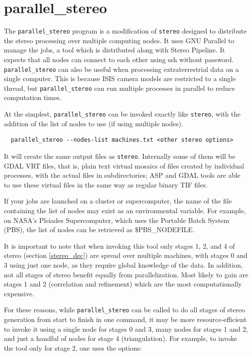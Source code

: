 \section{parallel\_stereo}
\label{parallel}

The \texttt{parallel\_stereo} program is a modification of
\texttt{stereo} designed to distribute the stereo processing over
multiple computing nodes. It uses GNU Parallel to manage the jobs, a tool which
is distributed along with Stereo Pipeline. It expects that all nodes
can connect to each other using ssh without password. \texttt{parallel\_stereo}
can also be useful when processing extraterrestrial data on a single computer.
This is because ISIS camera models are restricted to a single thread, but
\texttt{parallel\_stereo} can run multiple processes in parallel to reduce
computation times.

At the simplest, \texttt{parallel\_stereo} can be invoked exactly like \texttt{stereo},
with the addition of the list of nodes to use (if using multiple nodes).

\begin{verbatim}
  parallel_stereo --nodes-list machines.txt <other stereo options>
\end{verbatim}

It will create the same output files as \texttt{stereo}. Internally
some of them will be GDAL VRT files, that is, plain text virtual mosaics 
of files created by individual processes, with the actual files in subdirectories;
ASP and GDAL tools are able to use these
virtual files in the same way as regular binary TIF files.

If your jobs are launched on a cluster or supercomputer, the name of the
file containing the list of nodes may exist as an environmental
variable. For example, on NASA's Pleiades Supercomputer, which uses the
Portable Batch System (PBS), the list of nodes can be retrieved as
\$PBS\_NODEFILE.

It is important to note that when invoking this tool only stages 1, 2,
and 4 of stereo (section \ref{stereo_dec}) are spread over multiple
machines, with stages 0 and 3 using just one node, as they require
global knowledge of the data. In addition, not all stages of stereo
benefit equally from parallelization. Most likely to gain are stages 1
and 2 (correlation and refinement) which are the most computationally
expensive.

For these reasons, while \texttt{parallel\_stereo} can be called to do
all stages of stereo generation from start to finish in one command, it
may be more resource-efficient to invoke it using a single node for
stages 0 and 3, many nodes for stages 1 and 2, and just a handful of
nodes for stage 4 (triangulation). For example, to invoke the tool
only for stage 2, one uses the options:

